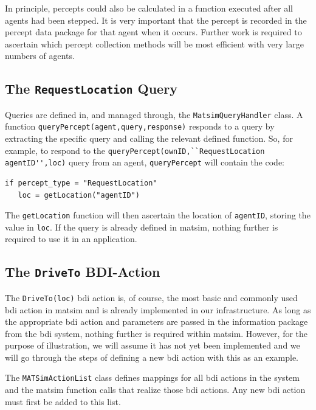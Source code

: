 In principle, percepts could also be calculated in a function 
executed after all agents had been stepped. It is very important 
that the percept is recorded in the percept data
package for that agent when it occurs. Further work is required to ascertain which
percept collection methods will be most efficient with very large
numbers of agents.

\subsection{The \lstinline{RequestLocation} Query}
Queries are defined in, and managed through, the \lstinline{MatsimQueryHandler}
class.
A function \lstinline{queryPercept(agent,query,response)} responds to a query by
extracting the specific query and calling the relevant defined
function. So, for example, to respond to the
\lstinline{queryPercept(ownID,``RequestLocation agentID'',loc)} query from an
agent, \lstinline{queryPercept} will contain the code:
\begin{lstlisting}
if percept_type = "RequestLocation"
   loc = getLocation("agentID")
\end{lstlisting}
The \lstinline{getLocation} function will then ascertain the location of
\lstinline{agentID}, storing the value in \lstinline{loc}. 
%
If the query is already defined in \gls{matsim}, nothing further is required
to use it in an application.

\subsection{The \lstinline{DriveTo} BDI-Action}
The \lstinline{DriveTo(loc)} \gls{bdi} action is, of course, the most basic and
commonly used \gls{bdi} action in \gls{matsim} and is already
implemented in our infrastructure. As long as the appropriate \gls{bdi}
action and parameters are passed in the information package from the
\gls{bdi} system, nothing further is required within \gls{matsim}. However, for
the purpose of illustration, we will assume it has not yet been
implemented and we will go through the steps of defining a new \gls{bdi}
action with this as an example.

The \lstinline{MATSimActionList} class defines mappings for all \gls{bdi}
actions in the system and the \gls{matsim} function calls that realize those
\gls{bdi} actions.  Any new \gls{bdi} action must first be added to this list.

